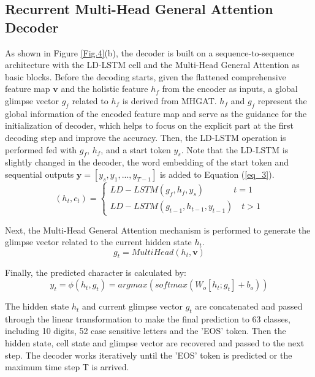 \documentclass[runningheads]{llncs}
\begin{document}
\subsection{Recurrent Multi-Head General Attention Decoder}
As shown in Figure \ref{Fig.4}(b), the decoder is built on a sequence-to-sequence architecture with the LD-LSTM cell and the Multi-Head General Attention as basic blocks. Before the decoding starts, given the flattened comprehensive feature map $\mathbf{v}$ and the holistic feature $h_{f}$ from the encoder as inputs, a global glimpse vector $g_{f}$ related to $h_{f}$ is derived from MHGAT. $h_{f}$ and $g_{f}$ represent the global information of the encoded feature map and serve as the guidance for the initialization of decoder, which helps to focus on the explicit part at the first decoding step and improve the accuracy. Then, the LD-LSTM operation is performed fed with $g_{f}$, $h_{f}$, and a start token $y_{s}$. Note that the LD-LSTM is slightly changed in the decoder, the word embedding of the start token and sequential outputs $\mathbf{y}=[y_{s}, y_{1},...,y_{T-1}]$ is added to Equation (\ref{eq_3}).
\begin{equation}
(h_{t}, c_{t})=\left\{\begin{array}{l}
LD-LSTM(g_{f}, h_{f}, y_{s}) \qquad \quad \ \  t=1\\
LD-LSTM(g_{t-1}, h_{t-1}, y_{t-1}) \quad t>1
\end{array}\right.
\end{equation}

Next, the Multi-Head General Attention mechanism is performed to generate the glimpse vector related to the current hidden state $h_{t}$.
\begin{equation}
g_{t} = MultiHead(h_{t}, \mathbf{v})
\end{equation}

Finally, the predicted character is calculated by:
\begin{equation}
y_{t} = \phi(h_{t},g_{t}) = argmax(softmax(W_{o}[h_{t};g_{t}] + b_{o}))
\end{equation}

The hidden state $h_{t}$ and current glimpse vector $g_{t}$ are concatenated and passed through the linear transformation to make the final prediction to 63 classes, including 10 digits, 52 case sensitive letters and the 'EOS' token. Then the hidden state, cell state and glimpse vector are recovered and passed to the next step. The decoder works iteratively until the 'EOS' token is predicted or the maximum time step T is arrived.
\end{document}
